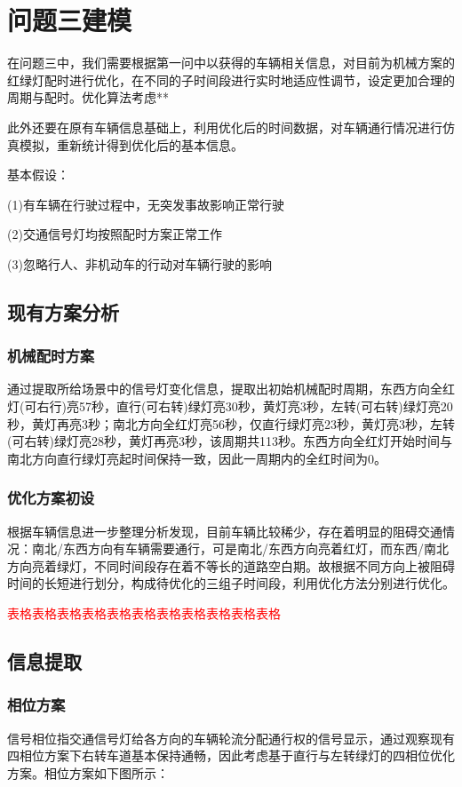 \section{问题三建模}
在问题三中，我们需要根据第一问中以获得的车辆相关信息，对目前为机械方案的红绿灯配时进行优化，在不同的子时间段进行实时地适应性调节，设定更加合理的周期与配时。优化算法考虑**

此外还要在原有车辆信息基础上，利用优化后的时间数据，对车辆通行情况进行仿真模拟，重新统计得到优化后的基本信息。

基本假设：

(1)有车辆在行驶过程中，无突发事故影响正常行驶

(2)交通信号灯均按照配时方案正常工作

(3)忽略行人、非机动车的行动对车辆行驶的影响

\subsection{现有方案分析}

\subsubsection{机械配时方案}
通过提取所给场景中的信号灯变化信息，提取出初始机械配时周期，东西方向全红灯(可右行)亮57秒，直行(可右转)绿灯亮30秒，黄灯亮3秒，左转(可右转)绿灯亮20秒，黄灯再亮3秒；南北方向全红灯亮56秒，仅直行绿灯亮23秒，黄灯亮3秒，左转(可右转)绿灯亮28秒，黄灯再亮3秒，该周期共113秒。东西方向全红灯开始时间与南北方向直行绿灯亮起时间保持一致，因此一周期内的全红时间为0。

\subsubsection{优化方案初设}
根据车辆信息进一步整理分析发现，目前车辆比较稀少，存在着明显的阻碍交通情况：南北/东西方向有车辆需要通行，可是南北/东西方向亮着红灯，而东西/南北方向亮着绿灯，不同时间段存在着不等长的道路空白期。故根据不同方向上被阻碍时间的长短进行划分，构成待优化的三组子时间段，利用优化方法分别进行优化。

\textcolor{red}{表格表格表格表格表格表格表格表格表格表格表格}

\subsection{信息提取}

\subsubsection{相位方案}
信号相位指交通信号灯给各方向的车辆轮流分配通行权的信号显示，通过观察现有四相位方案下右转车道基本保持通畅，因此考虑基于直行与左转绿灯的四相位优化方案。相位方案如下图所示：

